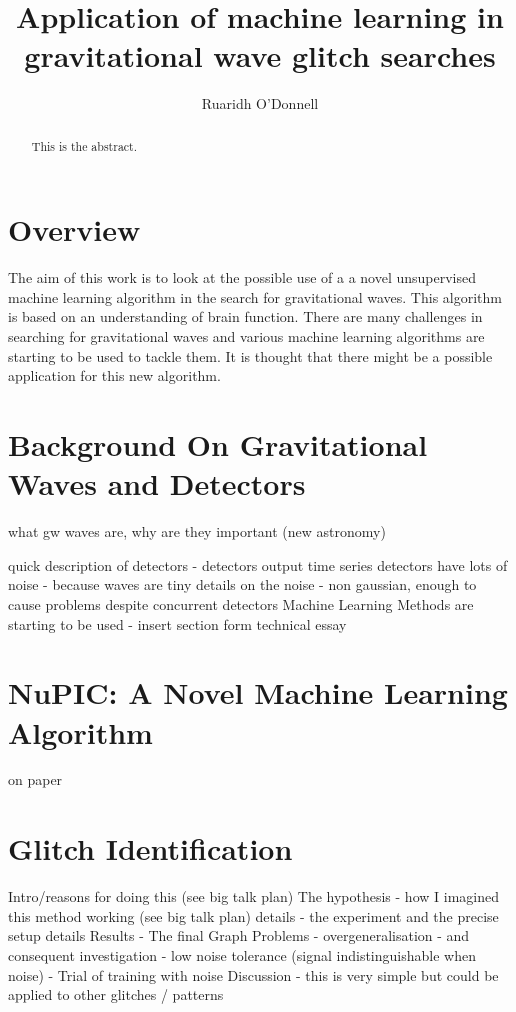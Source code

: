 \documentclass[a4paper]{jpconf}
\begin{document}
\title{Application of machine learning in gravitational wave glitch searches}

\author{Ruaridh O'Donnell}


\begin{abstract}
This is the abstract.
\end{abstract}

\section{Overview}%
The aim of this work is to look at the possible use of a a novel unsupervised machine learning algorithm in the search for gravitational waves. This algorithm is based on an understanding of brain function. There are many challenges in searching for gravitational waves and various machine learning algorithms are starting to be used to tackle them. It is thought that there might be a possible application for this new algorithm.

\section{Background On Gravitational Waves and Detectors}\label{aargh}%
what gw waves are, why are they important (new astronomy)

quick description of detectors - detectors output time series
detectors have lots of noise - because waves are tiny
details on the noise - non gaussian, enough to cause problems despite concurrent detectors
Machine Learning Methods are starting to be used - insert section form technical essay

\section{NuPIC: A Novel Machine Learning Algorithm}%
on paper

\section{Glitch Identification}%
Intro/reasons for doing this (see big talk plan)
The hypothesis - how I imagined this method working (see big talk plan)
details - the experiment and the precise setup details
Results - The final Graph
Problems
 - overgeneralisation - and consequent investigation
 - low noise tolerance (signal indistinguishable when noise)
 - Trial of training with noise
Discussion - this is very simple but could be applied to other glitches / patterns
\end{document}
